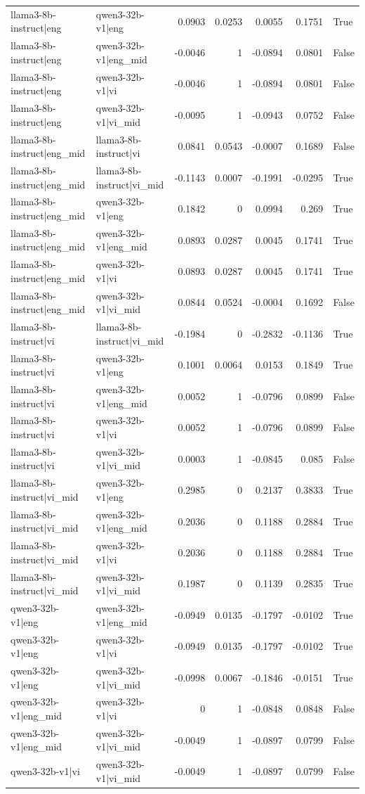 \begin{table}
\begin{tabular}{l l r r r r l}
llama3-8b-instruct|eng & qwen3-32b-v1|eng & 0.0903 & 0.0253 & 0.0055 & 0.1751 & True \\
llama3-8b-instruct|eng & qwen3-32b-v1|eng_mid & -0.0046 & 1 & -0.0894 & 0.0801 & False \\
llama3-8b-instruct|eng & qwen3-32b-v1|vi & -0.0046 & 1 & -0.0894 & 0.0801 & False \\
llama3-8b-instruct|eng & qwen3-32b-v1|vi_mid & -0.0095 & 1 & -0.0943 & 0.0752 & False \\
llama3-8b-instruct|eng_mid & llama3-8b-instruct|vi & 0.0841 & 0.0543 & -0.0007 & 0.1689 & False \\
llama3-8b-instruct|eng_mid & llama3-8b-instruct|vi_mid & -0.1143 & 0.0007 & -0.1991 & -0.0295 & True \\
llama3-8b-instruct|eng_mid & qwen3-32b-v1|eng & 0.1842 & 0 & 0.0994 & 0.269 & True \\
llama3-8b-instruct|eng_mid & qwen3-32b-v1|eng_mid & 0.0893 & 0.0287 & 0.0045 & 0.1741 & True \\
llama3-8b-instruct|eng_mid & qwen3-32b-v1|vi & 0.0893 & 0.0287 & 0.0045 & 0.1741 & True \\
llama3-8b-instruct|eng_mid & qwen3-32b-v1|vi_mid & 0.0844 & 0.0524 & -0.0004 & 0.1692 & False \\
llama3-8b-instruct|vi & llama3-8b-instruct|vi_mid & -0.1984 & 0 & -0.2832 & -0.1136 & True \\
llama3-8b-instruct|vi & qwen3-32b-v1|eng & 0.1001 & 0.0064 & 0.0153 & 0.1849 & True \\
llama3-8b-instruct|vi & qwen3-32b-v1|eng_mid & 0.0052 & 1 & -0.0796 & 0.0899 & False \\
llama3-8b-instruct|vi & qwen3-32b-v1|vi & 0.0052 & 1 & -0.0796 & 0.0899 & False \\
llama3-8b-instruct|vi & qwen3-32b-v1|vi_mid & 0.0003 & 1 & -0.0845 & 0.085 & False \\
llama3-8b-instruct|vi_mid & qwen3-32b-v1|eng & 0.2985 & 0 & 0.2137 & 0.3833 & True \\
llama3-8b-instruct|vi_mid & qwen3-32b-v1|eng_mid & 0.2036 & 0 & 0.1188 & 0.2884 & True \\
llama3-8b-instruct|vi_mid & qwen3-32b-v1|vi & 0.2036 & 0 & 0.1188 & 0.2884 & True \\
llama3-8b-instruct|vi_mid & qwen3-32b-v1|vi_mid & 0.1987 & 0 & 0.1139 & 0.2835 & True \\
qwen3-32b-v1|eng & qwen3-32b-v1|eng_mid & -0.0949 & 0.0135 & -0.1797 & -0.0102 & True \\
qwen3-32b-v1|eng & qwen3-32b-v1|vi & -0.0949 & 0.0135 & -0.1797 & -0.0102 & True \\
qwen3-32b-v1|eng & qwen3-32b-v1|vi_mid & -0.0998 & 0.0067 & -0.1846 & -0.0151 & True \\
qwen3-32b-v1|eng_mid & qwen3-32b-v1|vi & 0 & 1 & -0.0848 & 0.0848 & False \\
qwen3-32b-v1|eng_mid & qwen3-32b-v1|vi_mid & -0.0049 & 1 & -0.0897 & 0.0799 & False \\
qwen3-32b-v1|vi & qwen3-32b-v1|vi_mid & -0.0049 & 1 & -0.0897 & 0.0799 & False \\
\bottomrule
\end{tabular}
\end{table}
